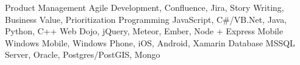 \begin{cvskills}
  \cvskill
    {Product Management}
    {Agile Development, Confluence, Jira, Story Writing, Business Value, Prioritization}
  \cvskill
    {Programming}
    {JavaScript, C\#/VB.Net, Java, Python, C++}
  \cvskill
    {Web}
    {Dojo, jQuery, Meteor, Ember, Node + Express}
  \cvskill
    {Mobile}
    {Windows Mobile, Windows Phone, iOS, Android, Xamarin}
  \cvskill
    {Database}
    {MSSQL Server, Oracle, Postgres/PostGIS, Mongo}
\end{cvskills}
